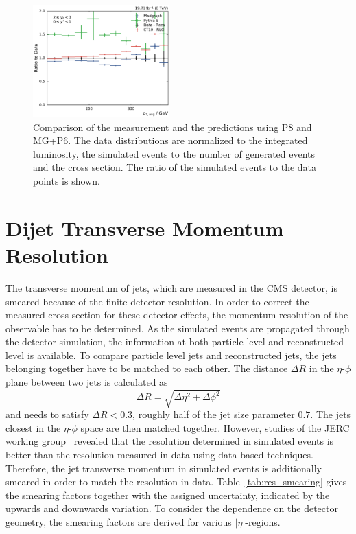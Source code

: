 \begin{figure}[htbp]
    \includegraphics[width=0.47\textwidth]{figures/measurement/ratio_reco_to_data_yb2ys0.pdf}
    \caption[Comparison of data with simulated events]{Comparison of the measurement and the predictions using P8 and MG+P6. The data distributions are normalized
    to the integrated luminosity, the simulated events to the number of generated events and the cross section. The ratio of the simulated
    events to the data points is shown.}
    \label{fig:ratio_recotodata}
\end{figure}


\section{Dijet Transverse Momentum  Resolution}
\label{sec:resolution}

The transverse momentum of jets, which are measured in the CMS detector, is
smeared because of the finite detector resolution. In order to correct the
measured cross section for these detector effects, the momentum resolution of
the observable has to be determined. As the simulated events are propagated
through the detector simulation, the information at both particle level and
reconstructed level is available. To compare particle level jets and
reconstructed jets, the jets belonging together have to be matched to each
other. The distance $\Delta R$ in the $\eta$-$\phi$ plane between two jets is
calculated as
%
\begin{equation}
\Delta R = \sqrt{\Delta \eta^2 + \Delta \phi^2}
\end{equation}
%
and needs to satisfy $\Delta R < 0.3$, roughly half of the jet size parameter
$0.7$. The jets closest in the $\eta$-$\phi$ space are then matched together.
However, studies of the \textsc{JERC} working group~\cite{jetmet:resolution}
revealed that the resolution determined in simulated events is better than the
resolution measured in data using data-based techniques. Therefore, the jet
transverse momentum in simulated events is additionally smeared in order to
match the resolution in data.  Table~\ref{tab:res_smearing} gives the smearing
factors together with the assigned uncertainty, indicated by the upwards and
downwards variation. To consider the dependence on the detector geometry, the
smearing factors are derived for various $|\eta|$-regions.

